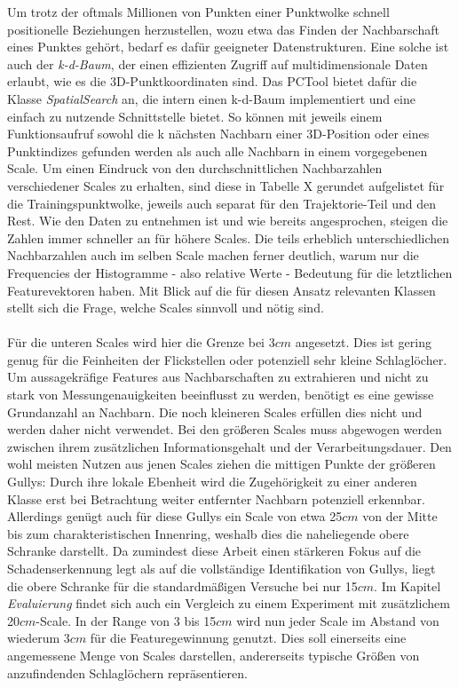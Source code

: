 Um trotz der oftmals Millionen von Punkten einer Punktwolke schnell positionelle Beziehungen herzustellen, wozu etwa das Finden der Nachbarschaft eines Punktes gehört, bedarf es dafür geeigneter Datenstrukturen. Eine solche ist auch der \textit{k-d-Baum}, der einen effizienten Zugriff auf multidimensionale Daten erlaubt, wie es die 3D-Punktkoordinaten sind. Das PCTool bietet dafür die Klasse \textit{SpatialSearch} an, die intern einen k-d-Baum implementiert und eine einfach zu nutzende Schnittstelle bietet. So können mit jeweils einem Funktionsaufruf sowohl die k nächsten Nachbarn einer 3D-Position oder eines Punktindizes gefunden werden als auch alle Nachbarn in einem vorgegebenen Scale. Um einen Eindruck von den durchschnittlichen Nachbarzahlen verschiedener Scales zu erhalten, sind diese in Tabelle X gerundet aufgelistet für die Trainingspunktwolke, jeweils auch separat für den Trajektorie-Teil und den Rest. Wie den Daten zu entnehmen ist und wie bereits angesprochen, steigen die Zahlen immer schneller an für höhere Scales. Die teils erheblich unterschiedlichen Nachbarzahlen auch im selben Scale machen ferner deutlich, warum nur die Frequencies der Histogramme - also relative Werte - Bedeutung für die letztlichen Featurevektoren haben. Mit Blick auf die für diesen Ansatz relevanten Klassen stellt sich die Frage, welche Scales sinnvoll und nötig sind. \\\\
Für die unteren Scales wird hier die Grenze bei 3$cm$ angesetzt. Dies ist gering genug für die Feinheiten der Flickstellen oder potenziell sehr kleine Schlaglöcher. Um aussagekräfige Features aus Nachbarschaften zu extrahieren und nicht zu stark von Messungenauigkeiten beeinflusst zu werden, benötigt es eine gewisse Grundanzahl an Nachbarn. Die noch kleineren Scales erfüllen dies nicht und werden daher nicht verwendet. Bei den größeren Scales muss abgewogen werden zwischen ihrem zusätzlichen Informationsgehalt und der Verarbeitungsdauer. Den wohl meisten Nutzen aus jenen Scales ziehen die mittigen Punkte der größeren Gullys: Durch ihre lokale Ebenheit wird die Zugehörigkeit zu einer anderen Klasse erst bei Betrachtung weiter entfernter Nachbarn potenziell erkennbar. Allerdings genügt auch für diese Gullys ein Scale von etwa 25$cm$ von der Mitte bis zum charakteristischen Innenring, weshalb dies die naheliegende obere Schranke darstellt. Da zumindest diese Arbeit einen stärkeren Fokus auf die Schadenserkennung legt als auf die vollständige Identifikation von Gullys, liegt die obere Schranke für die standardmäßigen Versuche bei nur 15$cm$. Im Kapitel \textit{Evaluierung} findet sich auch ein Vergleich zu einem Experiment mit zusätzlichem 20$cm$-Scale. In der Range von 3 bis 15$cm$ wird nun jeder Scale im Abstand von wiederum 3$cm$ für die Featuregewinnung genutzt. Dies soll einerseits eine angemessene Menge von Scales darstellen, andererseits typische Größen von anzufindenden Schlaglöchern repräsentieren.

